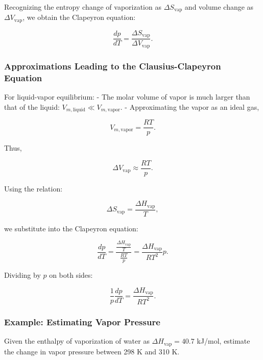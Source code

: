 \documentclass{article}
\theoremstyle{definition}
\begin{document}
Recognizing the entropy change of vaporization as \( \Delta S_{\text{vap}} \) and volume change as \( \Delta V_{\text{vap}} \), we obtain the Clapeyron equation:

\begin{equation}
\frac{dp}{dT} = \frac{\Delta S_{\text{vap}}}{\Delta V_{\text{vap}}}.
\end{equation}

\subsubsection{Approximations Leading to the Clausius-Clapeyron Equation}
For liquid-vapor equilibrium:
- The molar volume of vapor is much larger than that of the liquid: \( V_{m,\text{liquid}} \ll V_{m,\text{vapor}} \).
- Approximating the vapor as an ideal gas,

\begin{equation}
V_{m,\text{vapor}} = \frac{RT}{p}.
\end{equation}

Thus,

\begin{equation}
\Delta V_{\text{vap}} \approx \frac{RT}{p}.
\end{equation}

Using the relation:

\begin{equation}
\Delta S_{\text{vap}} = \frac{\Delta H_{\text{vap}}}{T},
\end{equation}

we substitute into the Clapeyron equation:

\begin{equation}
\frac{dp}{dT} = \frac{\frac{\Delta H_{\text{vap}}}{T}}{\frac{RT}{p}} = \frac{\Delta H_{\text{vap}}}{RT^2} p.
\end{equation}

Dividing by \( p \) on both sides:

\begin{equation}
\frac{1}{p} \frac{dp}{dT} = \frac{\Delta H_{\text{vap}}}{RT^2}.
\end{equation}

\subsubsection{Example: Estimating Vapor Pressure}
Given the enthalpy of vaporization of water as \( \Delta H_{\text{vap}} = 40.7 \) kJ/mol, estimate the change in vapor pressure between 298 K and 310 K.
\end{document}
